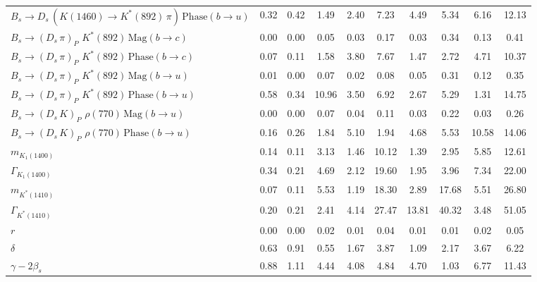 \begin{tabular}{l  c  c  c  c  c  c  c  c  | c }
$B_s \to D_s \, ( K(1460) \to K^{*}(892) \, \pi ) \, \text{Phase} (b \to u)$ & 0.32 & 0.42 & 1.49 & 2.40 & 7.23 & 4.49 & 5.34 & 6.16 & 12.13 \\ 
$B_s \to ( D_s \, \pi)_{P} \, \, K^{*}(892) \, \text{Mag} (b \to c)$ & 0.00 & 0.00 & 0.05 & 0.03 & 0.17 & 0.03 & 0.34 & 0.13 & 0.41 \\ 
$B_s \to ( D_s \, \pi)_{P} \, \, K^{*}(892) \, \text{Phase} (b \to c)$ & 0.07 & 0.11 & 1.58 & 3.80 & 7.67 & 1.47 & 2.72 & 4.71 & 10.37 \\ 
$B_s \to ( D_s \, \pi)_{P} \, \, K^{*}(892) \, \text{Mag} (b \to u)$ & 0.01 & 0.00 & 0.07 & 0.02 & 0.08 & 0.05 & 0.31 & 0.12 & 0.35 \\ 
$B_s \to ( D_s \, \pi)_{P} \, \, K^{*}(892) \, \text{Phase} (b \to u)$ & 0.58 & 0.34 & 10.96 & 3.50 & 6.92 & 2.67 & 5.29 & 1.31 & 14.75 \\ 
$B_s \to ( D_s \, K)_{P} \, \, \rho(770) \, \text{Mag} (b \to u)$ & 0.00 & 0.00 & 0.07 & 0.04 & 0.11 & 0.03 & 0.22 & 0.03 & 0.26 \\ 
$B_s \to ( D_s \, K)_{P} \, \, \rho(770) \, \text{Phase} (b \to u)$ & 0.16 & 0.26 & 1.84 & 5.10 & 1.94 & 4.68 & 5.53 & 10.58 & 14.06 \\ 
$m_{K_1(1400)} $ & 0.14 & 0.11 & 3.13 & 1.46 & 10.12 & 1.39 & 2.95 & 5.85 & 12.61 \\ 
$\Gamma_{K_1(1400)}$ & 0.34 & 0.21 & 4.69 & 2.12 & 19.60 & 1.95 & 3.96 & 7.34 & 22.00 \\ 
$m_{K^{*}(1410)}$ & 0.07 & 0.11 & 5.53 & 1.19 & 18.30 & 2.89 & 17.68 & 5.51 & 26.80 \\ 
$\Gamma_{K^{*}(1410)}$ & 0.20 & 0.21 & 2.41 & 4.14 & 27.47 & 13.81 & 40.32 & 3.48 & 51.05 \\ 
$r$ & 0.00 & 0.00 & 0.02 & 0.01 & 0.04 & 0.01 & 0.01 & 0.02 & 0.05 \\ 
$\delta$ & 0.63 & 0.91 & 0.55 & 1.67 & 3.87 & 1.09 & 2.17 & 3.67 & 6.22 \\ 
$\gamma - 2 \beta_{s}$ & 0.88 & 1.11 & 4.44 & 4.08 & 4.84 & 4.70 & 1.03 & 6.77 & 11.43 \\ 
\hline
\hline
\end{tabular}
